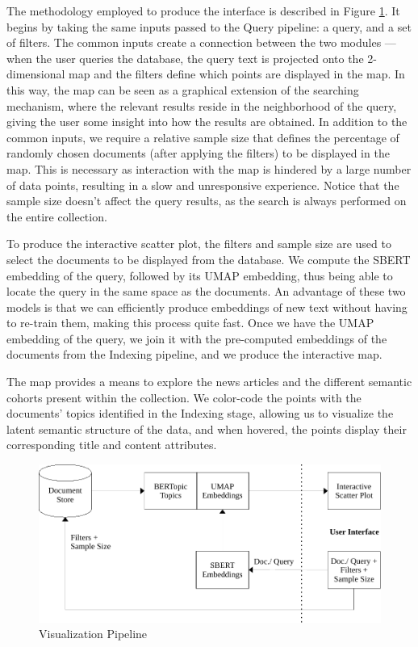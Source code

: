 \documentclass[a4paper]{article}
\begin{document}
The methodology employed to produce the interface is described in Figure \ref{vis_pipeline}. It begins by taking the same inputs passed to the Query pipeline: a query, and a set of filters. The common inputs create a connection between the two modules — when the user queries the database, the query text is projected onto the 2-dimensional map and the filters define which points are displayed in the map. In this way, the map can be seen as a graphical extension of the searching mechanism, where the relevant results reside in the neighborhood of the query, giving the user some insight into how the results are obtained. In addition to the common inputs, we require a relative sample size that defines the percentage of randomly chosen documents (after applying the filters) to be displayed in the map. This is necessary as interaction with the map is hindered by a large number of data points, resulting in a slow and unresponsive experience. Notice that the sample size doesn't affect the query results, as the search is always performed on the entire collection.

To produce the interactive scatter plot, the filters and sample size are used to select the documents to be displayed from the database. We compute the SBERT embedding of the query, followed by its UMAP embedding, thus being able to locate the query in the same space as the documents. An advantage of these two models is that we can efficiently produce embeddings of new text without having to re-train them, making this process quite fast. Once we have the UMAP embedding of the query, we join it with the pre-computed embeddings of the documents from the Indexing pipeline, and we produce the interactive map.

The map provides a means to explore the news articles and the different semantic cohorts present within the collection. We color-code the points with the documents' topics identified in the Indexing stage, allowing us to visualize the latent semantic structure of the data, and when hovered, the points display their corresponding title and content attributes.

\begin{figure}[H]
	\centering
	\includegraphics[scale=0.7]{./assets/vis_pipeline}
	\caption{Visualization Pipeline}
	\label{vis_pipeline}
\end{figure}
\end{document}
